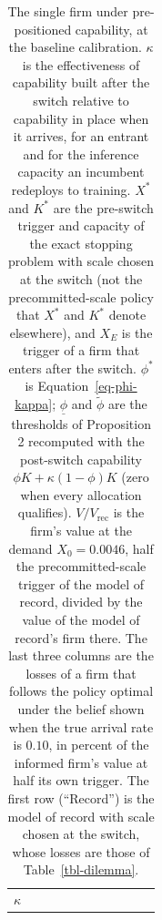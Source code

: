 \documentclass[
  11pt,
  letterpaper,
]{scrartcl}
\begin{document}
\begingroup\setlength{\tabcolsep}{2pt}

\begin{longtable}[]{@{}
  >{\raggedright\arraybackslash}p{}
  >{\raggedleft\arraybackslash}p{}
  >{\raggedleft\arraybackslash}p{}
  >{\raggedleft\arraybackslash}p{}
  >{\raggedleft\arraybackslash}p{}
  >{\raggedleft\arraybackslash}p{}
  >{\raggedleft\arraybackslash}p{}
  >{\raggedleft\arraybackslash}p{}
  >{\raggedleft\arraybackslash}p{}
  >{\raggedleft\arraybackslash}p{}
  >{\raggedleft\arraybackslash}p{}@{}}
\caption{The single firm under pre-positioned capability, at the
baseline calibration. \(\kappa\) is the effectiveness of capability
built after the switch relative to capability in place when it arrives,
for an entrant and for the inference capacity an incumbent redeploys to
training. \(X^*\) and \(K^*\) are the pre-switch trigger and capacity of
the exact stopping problem with scale chosen at the switch (not the
precommitted-scale policy that \(X^*\) and \(K^*\) denote elsewhere),
and \(X_E\) is the trigger of a firm that enters after the switch.
\(\phi^*\) is Equation~\ref{eq-phi-kappa}; \(\underline{\phi}\) and
\(\tilde{\phi}\) are the thresholds of Proposition 2 recomputed with the
post-switch capability \(\phi K + \kappa(1-\phi)K\) (zero when every
allocation qualifies). \(V/V_{\text{rec}}\) is the firm's value at the
demand \(X_0 = 0.0046\), half the precommitted-scale trigger of the
model of record, divided by the value of the model of record's firm
there. The last three columns are the losses of a firm that follows the
policy optimal under the belief shown when the true arrival rate is
\(0.10\), in percent of the informed firm's value at half its own
trigger. The first row (``Record'') is the model of record with scale
chosen at the switch, whose losses are those of
Table~\ref{tbl-dilemma}.}\label{tbl-capability}\tabularnewline
\toprule\noalign{}
\begin{minipage}[b]{\linewidth}\raggedright
\(\kappa\)
\end{minipage} & \begin{minipage}[b]{\linewidth}\raggedleft

\end{minipage}
\end{longtable}
\end{document}
